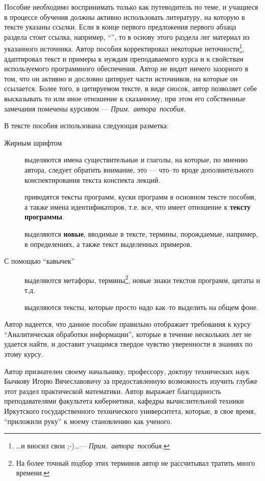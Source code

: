 \documentclass[12pt, openany, twoside]{book} %
\def\AR{{\em Прим.~автора~пособия}}
\begin{document}
Пособие необходимо воспринимать только как
путеводитель по теме, и учащиеся в
процессе обучения должны активно использовать литературу, на
которую в тексте указаны ссылки. Если в конце первого предложения
первого абзаца раздела стоит ссылка, например, ``\cite{AIDictionary}'', то
в основу этого раздела лег материал из указанного источника. Автор пособия корректировал
некоторые неточности\footnote{\ldots и вносил свои ;-)\ldots --- \AR.}, адаптировал текст и примеры к
нуждам преподаваемого курса и к свойствам используемого программного обеспечения.
Автор не видит ничего зазорного в том, что он активно и дословно
цитирует части источников, на которые он ссылается. Более того, в
цитируемом тексте, в виде сносок, автор позволяет себе высказывать
то или иное отношение к сказанному, при этом его собственные
замечания помечены курсивом --- \AR.

В тексте пособия использована следующая разметка:
\begin{description}
\item[Жирным шрифтом] выделяются имена существительные и глаголы, на которые,
по мнению автора, следует обратить внимание, это --- что--то вроде
дополнительного конспектирования текста конспекта лекций.
\item[] приводятся
тексты программ, куски программ в основном тексте пособия, а также имена
идентификаторов, т.е. все, что имеет отношение к {\bf тексту программы}.
\item[] выделяются 
{\bf новые}, вводимые в тексте, термины,
порождаемые, например, в определениях, а также текст выделенных примеров.
\item[\normalfont С помощью ``кавычек''] выделяются
метафоры, термины\footnote{На более точный подбор этих терминов автор не рассчитывал
тратить много времени.}, новые знаки текстов программ, цитаты и т.д.
\item[]
вы\-де\-ля\-ю\-тся тексты, которые
просто надо как--то выделить на общем фоне.
\end{description}

Автор надеется, что данное пособие правильно отображает требования к курсу 
``Аналитическая обработки информации'', которые в течение нескольких лет не удается найти, 
и  доставит учащимся твердое чувство уверенности в знаниях по этому курсу.

Автор признателен своему начальнику, профессору, доктору технических наук
Бычкову Игорю Вячеславовичу за
предоставленную возможность изучить глубже этот раздел практической математики. 
Автор выражает благодарность преподавателями факультета кибернетики, кафедры вычислительной техники Иркутского государственного технического университета, которые, в свое время,
``приложили руку'' к моему становлению как ученого.
\end{document}
